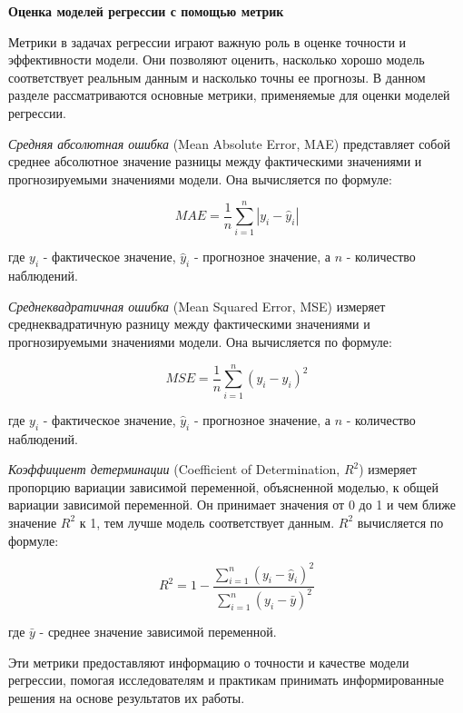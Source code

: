 \textbf{Оценка моделей регрессии с помощью метрик}

Метрики в задачах регрессии играют важную роль в оценке точности и эффективности модели. Они позволяют оценить, насколько хорошо модель соответствует реальным данным и насколько точны ее прогнозы. В данном разделе рассматриваются основные метрики, применяемые для оценки моделей регрессии.

\textit{Средняя абсолютная ошибка} (Mean Absolute Error, MAE) представляет собой среднее абсолютное значение разницы между фактическими значениями и прогнозируемыми значениями модели. Она вычисляется по формуле:

\[ MAE = \frac{1}{n} \sum_{i=1}^{n} |y_i - \hat{y}_i| \]
\vspace{0.5em}

где \( y_i \) - фактическое значение, \( \hat{y}_i \) - прогнозное значение, а \( n \) - количество наблюдений.
\vspace{1em}

\textit{Среднеквадратичная ошибка} (Mean Squared Error, MSE) измеряет среднеквадратичную разницу между фактическими значениями и прогнозируемыми значениями модели. Она вычисляется по формуле:

\[ MSE = \frac{1}{n} \sum_{i=1}^{n} (y_i - \hat{y}_i)^2 \]
\vspace{0.5em}

где \( y_i \) - фактическое значение, \( \hat{y}_i \) - прогнозное значение, а \( n \) - количество наблюдений.
\vspace{1em}

\textit{Коэффициент детерминации} (Coefficient of Determination, \( R^2 \)) измеряет пропорцию вариации зависимой переменной, объясненной моделью, к общей вариации зависимой переменной. Он принимает значения от 0 до 1 и чем ближе значение \( R^2 \) к 1, тем лучше модель соответствует данным. \( R^2 \) вычисляется по формуле:

\[ 
R^2 = 1 - \frac{\sum_{i=1}^{n} (y_i - \hat{y}_i)^2}{\sum_{i=1}^{n} (y_i - \bar{y})^2} 
\]
\vspace{0.5em}

где \( \bar{y} \) - среднее значение зависимой переменной. 

\vspace{1em}

Эти метрики предоставляют информацию о точности и качестве модели регрессии, помогая исследователям и практикам принимать информированные решения на основе результатов их работы.

